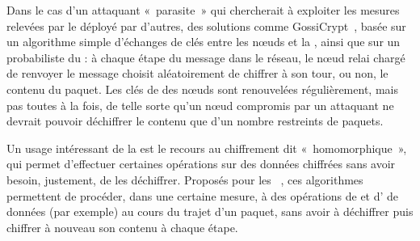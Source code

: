 Dans le cas d'un attaquant « parasite » qui chercherait à exploiter les mesures relevées par le \rc déployé par d'autres, des solutions comme GossiCrypt~\cite{LPH08}, basée sur un algorithme simple d'échanges de clés entre les nœuds et la \sdb, ainsi que sur un  probabiliste du : à chaque étape du message dans le réseau, le nœud relai chargé de renvoyer le message choisit aléatoirement de chiffrer à son tour, ou non, le contenu du paquet.
Les clés de  des nœuds sont renouvelées régulièrement, mais pas toutes à la fois, de telle sorte qu'un nœud compromis par un attaquant ne devrait pouvoir déchiffrer le contenu que d'un nombre restreints de paquets.

Un usage intéressant de la  est le recours au chiffrement dit « homomorphique », qui permet d'effectuer certaines opérations sur des données chiffrées sans avoir besoin, justement, de les déchiffrer.
Proposés pour les \rcs~\cite{BBTY14}, ces algorithmes permettent de procéder, dans une certaine mesure, à des opérations de  et d' de données (par exemple) au cours du trajet d'un paquet, sans avoir à déchiffrer puis chiffrer à nouveau son contenu à chaque étape.

